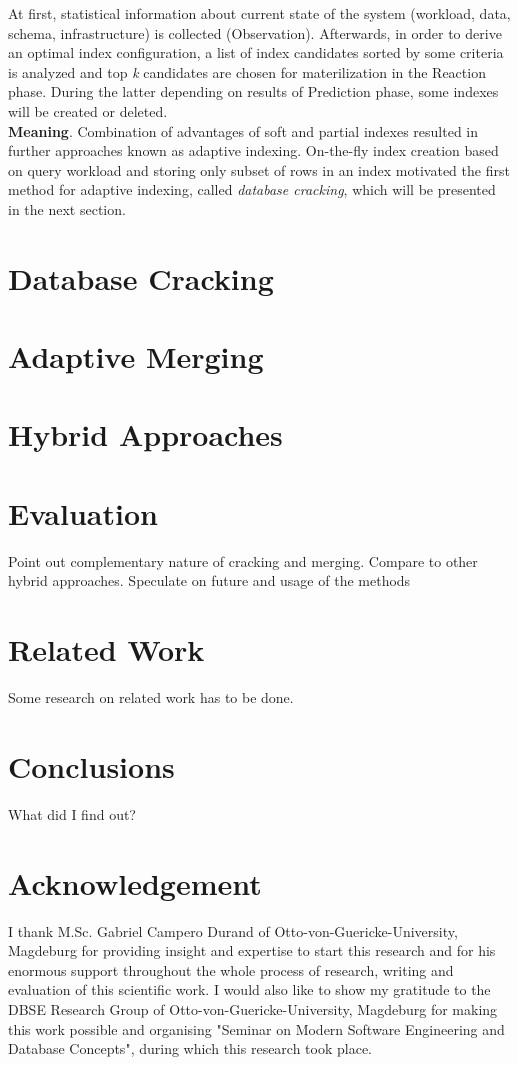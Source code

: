 \documentclass[10pt, conference, compsocconf]{IEEEtran}
\begin{document}
At first, statistical information about current state of the system (workload, data, schema, infrastructure) is collected (Observation). Afterwards, in order to derive an optimal index configuration, a list of index candidates sorted by some criteria is analyzed and top \textit{k} candidates are chosen for materilization in the Reaction phase. During the latter depending on results of Prediction phase, some indexes will be created or deleted.\\

\textbf{Meaning}. Combination of advantages of soft and partial indexes resulted in further approaches known as adaptive indexing. On-the-fly index creation based on query workload and storing only subset of rows in an index motivated the first method for adaptive indexing, called \textit{database cracking}, which will be presented in the next section.

\section{Database Cracking}
\section{Adaptive Merging}
\section{Hybrid Approaches}

\section{Evaluation}
Point out complementary nature of cracking and merging. Compare to other hybrid approaches. Speculate on future and usage of the methods

\section{Related Work}
Some research on related work has to be done.

\section{Conclusions}
What did I find out?

\section*{Acknowledgement}
I thank M.Sc. Gabriel Campero Durand of Otto-von-Guericke-University, Magdeburg for providing insight and expertise to start this research and for his enormous support throughout the whole process of research, writing and evaluation of this scientific work. I would also like to show my gratitude to the DBSE Research Group of Otto-von-Guericke-University, Magdeburg for making this work possible and organising "Seminar on Modern Software Engineering and Database Concepts", during which this research took place.
\end{document}
